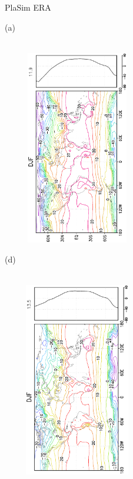 \documentclass[12pt,a4paper,twoside,openright,headinclude,liststotoc,bibtotoc]{scrreprt}
\begin{document}
\begin{figure}[H]
\hspace{3.0cm}PlaSim \vspace{0.2cm} \hspace{7.2cm} ERA \\
\parbox{8.5cm}{\hspace{0.50cm}\begin{scriptsize}(a)\end{scriptsize} \vspace{-0.7cm} \\
\includegraphics[height=8.5cm,width=6.5cm,angle=-90]
{eps/zonalcelysmtemp139DJF.eps}
}
\parbox{8.5cm}{\hspace{0.25cm}\begin{scriptsize}(d)\end{scriptsize} \vspace{-0.7cm} \\
\includegraphics[height=8.5cm,width=6.5cm,angle=-90]
{eps/zonalt21celysmsoil139DJF.eps}
}
\end{figure}
\end{document}
